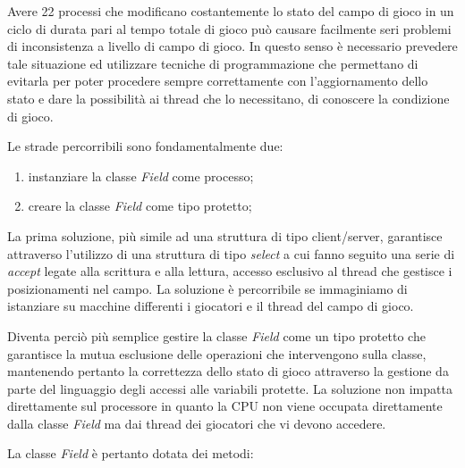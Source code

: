 \documentclass[aps,letterpaper,10pt]{article}
\begin{document}
Avere 22 processi che modificano costantemente lo stato del campo di gioco in un ciclo di durata pari al tempo totale di gioco pu\`o causare facilmente seri problemi di inconsistenza a livello di campo di gioco. In questo senso \`e necessario prevedere tale situazione ed utilizzare tecniche di programmazione che permettano di evitarla per poter procedere sempre correttamente con l'aggiornamento dello stato e dare la possibilit\`a ai thread che lo necessitano, di conoscere la condizione di gioco. \vspace{3mm}

Le strade percorribili sono fondamentalmente due:
\begin{enumerate}
	\item instanziare la classe \emph{Field} come processo;
	\item creare la classe \emph{Field} come tipo protetto;
\end{enumerate}

La prima soluzione, pi\`u simile ad una struttura di tipo client/server, garantisce attraverso l'utilizzo di una struttura di tipo \emph{select} a cui fanno seguito una serie di \emph{accept} legate alla scrittura e alla lettura, accesso esclusivo al thread che gestisce i posizionamenti nel campo. La soluzione \`e percorribile se immaginiamo di istanziare su macchine differenti i giocatori e il thread del campo di gioco. \vspace{3mm}

Diventa perci\`o pi\`u semplice gestire la classe \emph{Field} come un tipo protetto che garantisce la mutua esclusione delle operazioni che intervengono sulla classe, mantenendo pertanto la correttezza dello stato di gioco attraverso la gestione da parte del linguaggio degli accessi alle variabili protette. La soluzione non impatta direttamente sul processore in quanto la CPU non viene occupata direttamente dalla classe \emph{Field} ma dai thread dei giocatori che vi devono accedere. \vspace{3mm}

La classe \emph{Field} \`e pertanto dotata dei metodi: \vspace{3mm}
\end{document}
